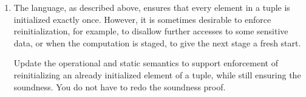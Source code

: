 \documentclass[11pt,a4paper]{article}
\newtheorem*{lemma}{Lemma}
\newtheorem*{theorem}{Theorem}
\begin{document}
\begin{enumerate}[label=\textbf{Excercise \arabic*\ }]
\begin{enumerate}
\begin{enumerate}
\begin{lemma}[Progress]
\begin{proof}
\begin{itemize}
\begin{itemize}
\item $e_1$ isn't a value. Here, we can construct an evaluation context $e = \#k~[e_1] := e_2$ so that we can construct the derivation $\inferrule{e_1 \to e_1'}{\#k~[e_1] := e_2 \to \#k~[e_1'] := e_2}$, hence taking a step.
\item $e_1$ is a value but $e_2$ isn't. Here, we can construct an evaluation context $e = \#k~e_1 := [e_2]$ so that we can construct the derivation $\inferrule{e_2 \to e_2'}{\#k~e_1 := [e_2] \to \#k~e_1 := [e_2']}$, hence taking a step.
\end{itemize}
this shows the case and concludes the proof.\qedhere
\end{itemize}
\end{proof}
\end{lemma}

\item Formulate the soundness theorem.
\begin{theorem}[Soundness]
$$
\vdash e:\tau \wedge e \to^* e' \implies e' \text{ is a value} \vee \exists e''. e' \to e''
$$
\end{theorem}
\end{enumerate}

\item The language, as described above, ensures that every element in a tuple is initialized exactly once. However,
it is sometimes desirable to enforce reinitialization, for example, to disallow further accesses to some
sensitive data, or when the computation is staged, to give the next stage a fresh start.

Update the operational and static semantics to support enforcement of reinitializing an already initialized
element of a tuple, while still ensuring the soundness. You do not have to redo the soundness proof.

\vspace{4mm}


\end{enumerate}
\end{enumerate}
\end{document}
